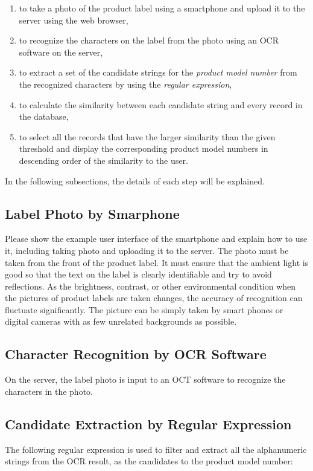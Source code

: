 \documentclass[technicalreport]{ieicej}
\begin{document}
    \begin{enumerate}
        \item to take a photo of the product label using a smartphone and upload it to the server using the web browser,
        \item to recognize the characters on the label from the photo using an OCR software on the server,
        \item to extract a set of the candidate strings for the {\em product model number} from the recognized characters by using the {\em regular expression}, 
        \item to calculate the similarity between each candidate string and every record in the database,
        \item to select all the records that have the larger similarity than the given threshold and display the corresponding product model numbers in descending order of the similarity to the user. 
    \end{enumerate}

In the following subsections, the details of each step will be explained.

\subsection{Label Photo by Smarphone}
Please show the example user interface of the smartphone and explain how to use it, including taking photo and uploading it to the server.
The photo must be taken from the front of the product label. It must ensure that the ambient light is good so that the text on the label is clearly identifiable and try to avoid reflections. As the brightness, contrast, or other environmental condition when the pictures of product labels are taken changes, the accuracy of recognition can fluctuate significantly. The picture can be simply taken by smart phones or digital cameras with as few unrelated backgrounds as possible.

\subsection{Character Recognition by OCR Software}
On the server, the label photo is input to an OCT software to recognize the characters in the photo.

\subsection{Candidate Extraction by Regular Expression}
The following regular expression is used to filter and extract all the alphanumeric strings from the OCR result, as the candidates to the product model number:
\end{document}
